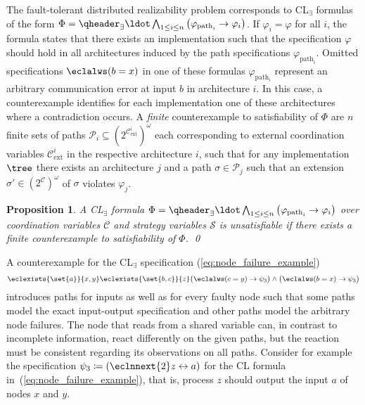 \documentclass{LMCS}
\theoremstyle{plain}\newtheorem{theorem}[thm]{Theorem}
\theoremstyle{plain}\newtheorem{lemma}[thm]{Lemma}
\theoremstyle{plain}\newtheorem{proposition}[thm]{Proposition}
\theoremstyle{plain}\newtheorem{corollary}[thm]{Corollary}
\theoremstyle{definition}\newtheorem{definition}{Definition}[section]
\begin{document}
The fault-tolerant distributed realizability problem corresponds to  CL$_\exists$ formulas of the form $\Phi = \qheader_\exists \ldot \bigwedge_{1 \leq i \leq n} \big( \varphi_{\text{path}_i} \rightarrow \varphi_i \big)$.
If $\varphi_i = \varphi$ for all $i$, the formula states that there exists an implementation such that the specification $\varphi$ should hold in all architectures induced by the path specifications $\varphi_{\text{path}_i}$.
Omitted specifications $\eclalws (b = x)$ in one of these formulas $\varphi_{\text{path}_i}$ represent an arbitrary communication error at input $b$ in architecture $i$.
In this case, a counterexample identifies for each implementation one of these architectures where a contradiction occurs.
A \emph{finite} counterexample to satisfiability of $\Phi$ are $n$ finite sets of paths $\mathcal{P}_i \subseteq (2^{\mathcal{C}_\text{ext}^i})^\omega$ each corresponding to external coordination variables $\mathcal{C}_\text{ext}^i$ in the respective architecture $i$, such that for any implementation $\tree$ there exists an architecture $j$ and a path $\sigma \in \mathcal{P}_j$ such that an extension $\sigma' \in (2^\mathcal{C})^\omega$ of $\sigma$ violates $\varphi_j$.
\begin{proposition} \label{eq:dr_with_faults_finite_unsatisfiability}
  A CL$_\exists$ formula $\Phi = \qheader_\exists \ldot \bigwedge_{1 \leq i \leq n} \big( \varphi_{\text{path}_i} \rightarrow \varphi_i \big)$ over coordination variables $\mathcal{C}$ and strategy variables $\mathcal{S}$ is unsatisfiable if there exists a finite counterexample to satisfiability of $\Phi$. \qed
\end{proposition}\noindent
A counterexample for the CL$_\exists$ specification (\ref{eq:node_failure_example})
\begin{equation*}
  \eclexists{\set{a}}{x,y} \eclexists{\set{b,c}}{z} \big(\eclalws (c = y) \rightarrow \psi_3 \big) \land \big(\eclalws (b = x) \rightarrow \psi_3 \big)
\end{equation*}
introduces paths for inputs as well as for every faulty node such that some paths model the exact input-output specification and other paths model the arbitrary node failures.
The node that reads from a shared variable can, in contrast to incomplete information, react differently on the given paths, but the reaction must be consistent regarding its observations on all paths.
Consider for example the specification $\psi_3 \coloneqq (\eclnnext{2} z \leftrightarrow a)$ for the CL formula in~(\ref{eq:node_failure_example}), that is, process $z$ should output the input $a$ of nodes $x$ and $y$.
\end{document}
